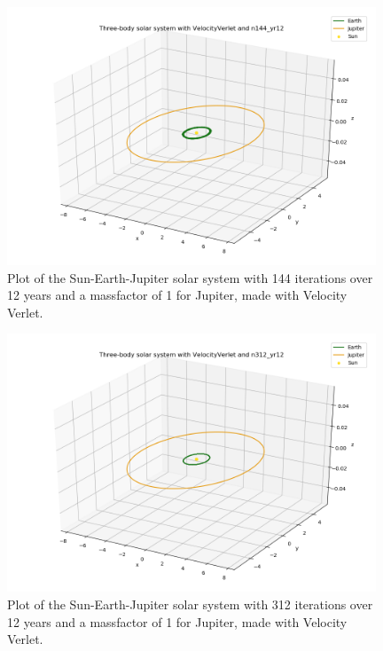 \documentclass{article}
\begin{document}
    \begin{figure}[H]
        \centering
        \includegraphics[width = 11cm]{img/plot3D_S_E_J_V_n144_yr12.png}
        \caption{Plot of the Sun-Earth-Jupiter solar system with 144 iterations over 12 years and a massfactor of 1 for Jupiter, made with Velocity Verlet.}
        \label{fig:plot3D_S_E_J_V_n144_yr12}
    \end{figure}

    \begin{figure}[H]
        \centering
        \includegraphics[width = 11cm]{img/plot3D_S_E_J_V_n312_yr12.png}
        \caption{Plot of the Sun-Earth-Jupiter solar system with 312 iterations over 12 years and a massfactor of 1 for Jupiter, made with Velocity Verlet.}
        \label{fig:plot3D_S_E_J_V_n312_yr12}
    \end{figure}
\end{document}
